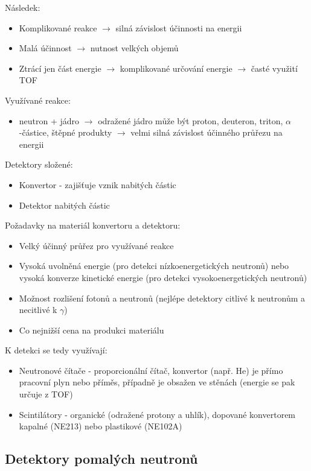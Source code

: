 \documentclass[../../main.tex]{subfiles}
\begin{document}
Následek:
\begin{itemize}
	\item Komplikované reakce $\rightarrow$ silná závislost účinnosti na energii
	\item Malá účinnost $\rightarrow$ nutnost velkých objemů
	\item Ztrácí jen část energie $\rightarrow$ komplikované určování energie $\rightarrow$ časté využití TOF
\end{itemize}	

Využívané reakce:
\begin{itemize}
	\item neutron + jádro $\rightarrow$ odražené jádro může být proton, deuteron, triton, $\alpha$-částice, štěpné produkty $\rightarrow$ velmi silná závislost účinného průřezu na energii
\end{itemize}

Detektory složené:
\begin{itemize}
	\item Konvertor - zajišťuje vznik nabitých částic
	\item Detektor nabitých částic
\end{itemize}

Požadavky na materiál konvertoru a detektoru:
\begin{itemize}
	\item Velký účinný průřez pro využívané reakce
	\item Vysoká uvolněná energie (pro detekci nízkoenergetických neutronů) nebo vysoká konverze kinetické energie (pro detekci vysokoenergetických neutronů)
	\item Možnost rozlišení fotonů a neutronů (nejlépe detektory citlivé k neutronům a necitlivé k $\gamma$)
	\item Co nejnižší cena na produkci materiálu
\end{itemize}

K detekci se tedy využívají:
\begin{itemize}
	\item Neutronové čítače - proporcionální čítač, konvertor (např. He) je přímo pracovní plyn nebo příměs, případně je obsažen ve stěnách (energie se pak určuje z TOF)
	\item Scintilátory - organické (odražené protony a uhlík), dopované konvertorem kapalné (NE213) nebo plastikové (NE102A)
\end{itemize}
	
\subsection{Detektory pomalých neutronů}
\end{document}
